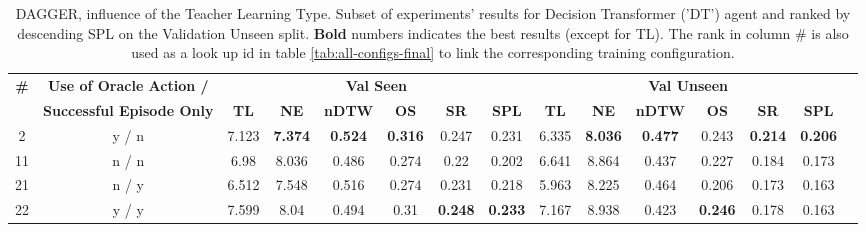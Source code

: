 \begin{table}
\centering
\caption{\label{tab:dt_dagger_pe_oa}DAGGER, influence of the Teacher Learning Type. Subset of experiments' results for Decision Transformer ('DT') agent and ranked by descending SPL on the Validation Unseen split. \textbf{Bold} numbers indicates the best results (except for TL). The rank in column \# is also used as a look up id in table \ref{tab:all-configs-final} to link the corresponding training configuration.}
\begin{tabular}{@{\hskip3pt}c@{\hskip3pt}c@{\hskip3pt}c@{\hskip3pt}c@{\hskip3pt}c@{\hskip3pt}c@{\hskip3pt}c@{\hskip3pt}c@{\hskip3pt}c@{\hskip3pt}c@{\hskip3pt}c@{\hskip3pt}c@{\hskip3pt}c@{\hskip3pt}c@{\hskip3pt}c}
\toprule
                                  \textbf{\#} & \textbf{ Use of Oracle Action / } & \multicolumn{6}{c}{\textbf{Val Seen}} & \multicolumn{6}{c}{\textbf{Val Unseen}} \\
\cmidrule(l){3-8}\cmidrule(l){9-14}\textbf{~} &                                               \textbf{Successful Episode Only} &       \textbf{TL} &     \textbf{NE} &   \textbf{nDTW} &     \textbf{OS} &     \textbf{SR} &    \textbf{SPL} &         \textbf{TL} &     \textbf{NE} &   \textbf{nDTW} &     \textbf{OS} &     \textbf{SR} &    \textbf{SPL} \\
\midrule
                                            2 &                                              y / n &             7.123 &  \textbf{7.374} &  \textbf{0.524} &  \textbf{0.316} &           0.247 &           0.231 &               6.335 &  \textbf{8.036} &  \textbf{0.477} &           0.243 &  \textbf{0.214} &  \textbf{0.206} \\
                                           11 &                                              n / n &              6.98 &           8.036 &           0.486 &           0.274 &            0.22 &           0.202 &               6.641 &           8.864 &           0.437 &           0.227 &           0.184 &           0.173 \\
                                           21 &                                              n / y &             6.512 &           7.548 &           0.516 &           0.274 &           0.231 &           0.218 &               5.963 &           8.225 &           0.464 &           0.206 &           0.173 &           0.163 \\
                                           22 &                                              y / y &             7.599 &            8.04 &           0.494 &            0.31 &  \textbf{0.248} &  \textbf{0.233} &               7.167 &           8.938 &           0.423 &  \textbf{0.246} &           0.178 &           0.163 \\
\bottomrule
\end{tabular}
\end{table}
